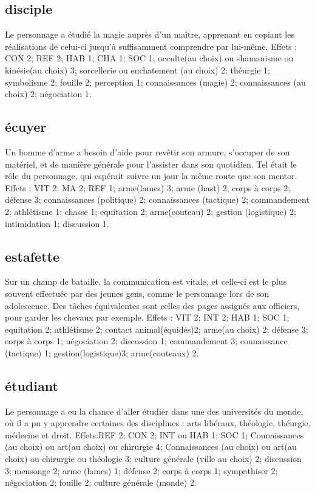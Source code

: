 \documentclass[10pt,a4paper,twocolumn]{book}
\begin{document}
\subsection*{disciple}
Le personnage a étudié la magie auprès d’un maître, apprenant en copiant les réalisations de celui-ci jusqu’à suffisamment comprendre par lui-même.
Effets : CON 2; REF 2; HAB 1; CHA 1; SOC 1; occulte(au choix) ou shamanisme ou kinésie(au choix) 3; sorcellerie ou enchatement (au choix) 2; théurgie 1; symbolisme 2; fouille 2; perception 1; connaissances (magie) 2; connaissances (au choix) 2; négociation 1.
\subsection*{écuyer}
Un homme d’arme a besoin d’aide pour revêtir son armure, s’occuper de son matériel, et de manière générale pour l’assister dans son quotidien. Tel était le rôle du personnage, qui espérait suivre un jour la même route que son mentor.
Effets : VIT 2; MA 2; REF 1; arme(lames) 3; arme (hast) 2; corps à corps 2; défense 3; connaissances (politique) 2; connaissances (tactique) 2; commandement 2; athlétisme 1; chasse 1; equitation 2; arme(couteau) 2; gestion (logistique) 2; intimidation 1; discussion 1.
\subsection*{estafette}
Sur un champ de bataille, la communication est vitale, et celle-ci est le plus souvent effectuée par des jeunes gens, comme le personnage lors de son adolescence. Des tâches équivalentes sont celles des pages assignés aux officiers, pour garder les chevaux par exemple.
Effets : VIT 2; INT 2; HAB 1; SOC 1; equitation 2; athlétisme 2; contact animal(équidés)2; arme(au choix) 2; défense 3; corps à corps 1; négociation 2; discussion 1; commandement 3; connaissance (tactique) 1; gestion(logistique)3; arme(couteaux) 2.
\subsection*{étudiant}
Le personnage a eu la chance d’aller étudier dans une des universités du monde, où il a pu y apprendre certaines des disciplines : arts libéraux, théologie, théurgie, médecine et droit.
Effets:REF 2; CON 2; INT ou HAB 1; SOC 1; Connaissances (au choix) ou art(au choix) ou chirurgie 4; Connaissances (au choix) ou art(au choix) ou chirurgie ou théologie 3; culture générale (ville au choix) 2; discussion 3; mensonge 2; arme (lames) 1; défense 2; corps à corps 1; sympathiser 2; négociation 2; fouille 2; culture générale (monde) 2.
\end{document}
